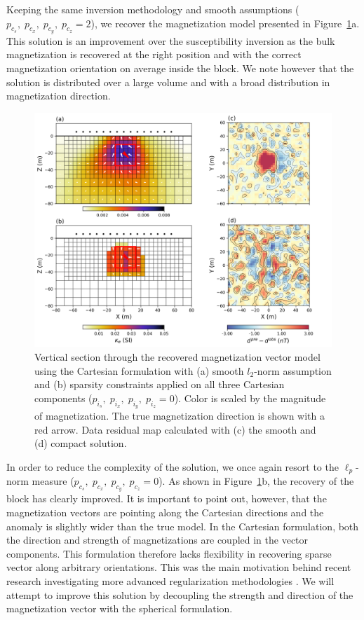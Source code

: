 \documentclass[paper]{geophysics}
\begin{document}
Keeping the same inversion methodology and smooth assumptions ($p_{c_s}, \;p_{c_x},\; p_{c_y},\; p_{c_z} = 2$), we recover the magnetization model presented in Figure~\ref{MVI_C_model}a.
This solution is an improvement over the susceptibility inversion as the bulk magnetization is recovered at the right position and with the correct magnetization orientation on average inside the block. We note however that the solution is distributed over a large volume and with a broad distribution in magnetization direction.

\begin{figure}[p!]
\includegraphics[width=\columnwidth]{Figures/Figure3.png}
\caption{Vertical section through the recovered magnetization vector model using the Cartesian formulation with (a) smooth $l_2$-norm assumption and (b) sparsity constraints applied on all three Cartesian components ($p_{i_s}, \;p_{i_x},\; p_{i_y},\; p_{i_z} = 0$). Color is scaled by the magnitude of magnetization. The true magnetization direction is shown with a red arrow. Data residual map calculated with (c) the smooth and (d) compact solution.}
\label{MVI_C_model}
\end{figure}

In order to reduce the complexity of the solution, we once again resort to the $\ell_p$-norm measure ($p_{c_s}, \;p_{c_x},\; p_{c_y},\; p_{c_z} = 0$). As shown in Figure~\ref{MVI_C_model}b, the recovery of the block has clearly improved. It is important to point out, however, that the magnetization vectors are pointing along the Cartesian directions and the anomaly is slightly wider than the true model. In the Cartesian formulation, both the direction and strength of magnetizations are coupled in the vector components. This formulation therefore lacks flexibility in recovering sparse vector along arbitrary orientations. This was the main motivation behind recent research investigating more advanced regularization methodologies \cite[~p.~101]{Zhu2015, Liu2015, Fournier2015}. We will attempt to improve this solution by decoupling the strength and direction of the magnetization vector with the spherical formulation.
\end{document}
